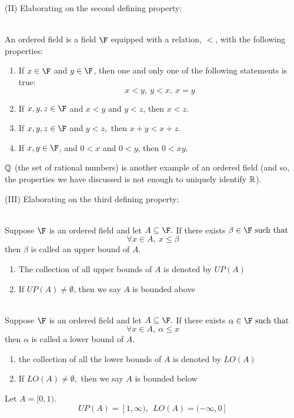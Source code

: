 \begin{description}
    \item[(II) Elaborating on the second defining property:] 
\end{description}
\begin{definition} \leavevmode \\
    An ordered field is a field $\F$ equipped with a relation, $<$, with the following properties:
    \begin{enumerate}[$(i)$]
        \item If $x \in \F$ and $y \in \F$, then one and only one of the following statements is true:
        $$x < y, ~y < x, ~x = y$$
        \item If $x,y,z\in \F$ and $x < y$ and $y < z$, then $x < z$.
        \item If $x,y,z \in \F$ and $y < z,$ then $x+y < x+z$.
        \item If $x,y \in \F$, and $0 < x$ and $0 < y$, then $0 < xy$.
    \end{enumerate}
\end{definition}

\begin{remark}
    $\mathbb{Q}$ (the set of rational numbers) is another example of an ordered field (and so, the properties we have discussed is not enough to uniquely identify $\mathbb{R}$).
\end{remark}

\begin{description}
    \item[(III) Elaborating on the third defining property:] 
\end{description}

\begin{definition} \leavevmode \\
    Suppose $\F$ is an ordered field and let $A \subseteq \F.$ If there exists $\beta \in \F \st$
    $$\forall x \in A, ~x \leq \beta$$
    then $\beta$ is called an upper bound of $A$.

    \begin{enumerate}[$*)$]
        \item The collection of all upper bounds of $A$ is denoted by $UP(A)$
        \item If $UP(A) \not = \emptyset$, then we say $A$ is bounded above
    \end{enumerate}
\end{definition}

\begin{definition} \leavevmode \\
    Suppose $\F$ is an ordered field and let $A \subseteq \F.$ If there exists $\alpha \in \F \st$
    $$\forall x \in A, ~\alpha \leq x$$
    then $\alpha$ is called a lower bound of $A$.
    
    \begin{enumerate}[$*)$]
        \item the collection of all the lower bounds of $A$ is denoted by $LO(A)$
        \item If $LO(A) \not = \emptyset,$ then we say $A$ is bounded below
    \end{enumerate}
\end{definition}

\begin{example}
    Let $A = [0,1).$
    $$UP(A) = [1, \infty), ~~LO(A) = (-\infty, 0]$$
\end{example}